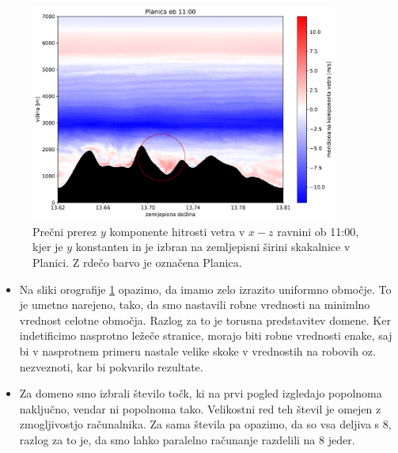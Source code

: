 \documentclass[mat2, tisk]{fmfdelo}
\begin{document}
\begin{figure}[h!]
  \centering
  \includegraphics[width=0.9\textwidth]{rezultati/v_yz_5.pdf}
  \caption{Prečni prerez $y$ komponente hitrosti vetra v $x-z$ ravnini ob 11:00, kjer je $y$ konstanten in je izbran na zemljepisni širini skakalnice v Planici.
  Z rdečo barvo je označena Planica.
  }
  \label{fig:planica}
\end{figure}

\begin{opomba}
  \hfill
  \begin{itemize}
    \item Na sliki orografije \ref{fig:planica} opazimo, da imamo zelo izrazito uniformno območje. 
    To je umetno narejeno, tako, da smo nastavili robne vrednosti na minimlno vrednost celotne 
    območja. Razlog za to je torusna predstavitev domene. Ker indetificimo nasprotno 
    ležeče stranice, morajo biti robne vrednosti enake, saj bi v nasprotnem primeru
    nastale velike skoke v vrednostih na robovih oz. nezveznoti, kar bi pokvarilo rezultate.
  \item Za domeno smo izbrali število točk, ki na prvi pogled izgledajo popolnoma naključno, 
  vendar ni popolnoma tako. Velikostni red teh števil je omejen z zmogljivostjo računalnika.
  Za sama števila pa opazimo, da so vsa deljiva s 8, razlog za to je, da smo lahko 
  paralelno računanje razdelili na 8 jeder.
  \end{itemize}
\end{opomba}
\end{document}

